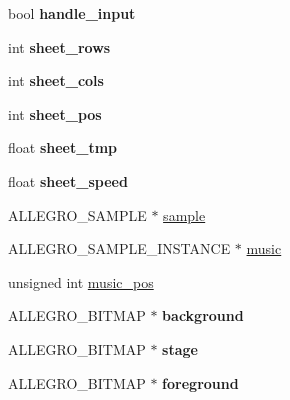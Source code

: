 \begin{DoxyCompactItemize}
\item 
\hypertarget{structLevel_a06cf4f2da517284d2006540051d3e5c0}{bool {\bfseries handle\-\_\-input}}\label{structLevel_a06cf4f2da517284d2006540051d3e5c0}

\item 
\hypertarget{structLevel_a6d608b79c9b4dd8a5efc0c7e5fb482b0}{int {\bfseries sheet\-\_\-rows}}\label{structLevel_a6d608b79c9b4dd8a5efc0c7e5fb482b0}

\item 
\hypertarget{structLevel_a8a5c443169a4ff15f330a65473eedb1b}{int {\bfseries sheet\-\_\-cols}}\label{structLevel_a8a5c443169a4ff15f330a65473eedb1b}

\item 
\hypertarget{structLevel_a21c699af201ffe60ccd1319b3f540947}{int {\bfseries sheet\-\_\-pos}}\label{structLevel_a21c699af201ffe60ccd1319b3f540947}

\item 
\hypertarget{structLevel_a22e80ea91fd267dae85c0457e581d072}{float {\bfseries sheet\-\_\-tmp}}\label{structLevel_a22e80ea91fd267dae85c0457e581d072}

\item 
\hypertarget{structLevel_a41db1345ac158898450907010a49748f}{float {\bfseries sheet\-\_\-speed}}\label{structLevel_a41db1345ac158898450907010a49748f}

\item 
\-A\-L\-L\-E\-G\-R\-O\-\_\-\-S\-A\-M\-P\-L\-E $\ast$ \hyperlink{structLevel_a234fa7b9ec35dd360e4e3c48a944fc7d}{sample}
\item 
\-A\-L\-L\-E\-G\-R\-O\-\_\-\-S\-A\-M\-P\-L\-E\-\_\-\-I\-N\-S\-T\-A\-N\-C\-E $\ast$ \hyperlink{structLevel_a41c6aae8f508e078b02c291e1d6f8e67}{music}
\item 
unsigned int \hyperlink{structLevel_a13e322deb3298846260af31324e5b492}{music\-\_\-pos}
\item 
\hypertarget{structLevel_a4b4dd31284206502977b3d5b95d52abc}{\-A\-L\-L\-E\-G\-R\-O\-\_\-\-B\-I\-T\-M\-A\-P $\ast$ {\bfseries background}}\label{structLevel_a4b4dd31284206502977b3d5b95d52abc}

\item 
\hypertarget{structLevel_a70b6ea7746ac88775b4197349ec312d1}{\-A\-L\-L\-E\-G\-R\-O\-\_\-\-B\-I\-T\-M\-A\-P $\ast$ {\bfseries stage}}\label{structLevel_a70b6ea7746ac88775b4197349ec312d1}

\item 
\hypertarget{structLevel_aa2b1c77ee0c36e44efb3a908cf4967dc}{\-A\-L\-L\-E\-G\-R\-O\-\_\-\-B\-I\-T\-M\-A\-P $\ast$ {\bfseries foreground}}\label{structLevel_aa2b1c77ee0c36e44efb3a908cf4967dc}


\end{DoxyCompactItemize}
